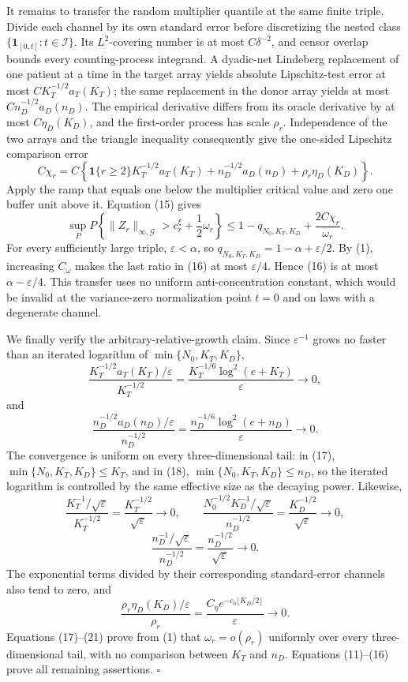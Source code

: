 It remains to transfer the random multiplier quantile at the same finite triple. Divide each channel by its own standard error before discretizing the nested class \(\{\mathbf 1_{[0,t]}:t\in\mathcal I\}\). Its \(L^2\)-covering number is at most \(C\delta^{-2}\), and censor overlap bounds every counting-process integrand. A dyadic-net Lindeberg replacement of one patient at a time in the target array yields absolute Lipschitz-test error at most \(CK_T^{-1/2}a_T(K_T)\); the same replacement in the donor array yields at most \(Cn_D^{-1/2}a_D(n_D)\). The empirical derivative differs from its oracle derivative by at most \(C\eta_D(K_D)\), and the first-order process has scale \(\rho_r\). Independence of the two arrays and the triangle inequality consequently give the one-sided Lipschitz comparison error
\[
 C\chi_r
 =C\left\{\mathbf 1\{r\ge2\}K_T^{-1/2}a_T(K_T)
 +n_D^{-1/2}a_D(n_D)+\rho_r\eta_D(K_D)\right\}. \tag{15}
\]
Apply the ramp that equals one below the multiplier critical value and zero one buffer unit above it. Equation (15) gives
\[
 \sup_P P\!\left\{\|Z_r\|_{\infty,\mathcal G}>c_r^\xi+\frac12\omega_r\right\}
 \le1-q_{N_0,K_T,K_D}+\frac{2C\chi_r}{\omega_r}. \tag{16}
\]
For every sufficiently large triple, \(\varepsilon<\alpha\), so \(q_{N_0,K_T,K_D}=1-\alpha+\varepsilon/2\). By (1), increasing \(C_\omega\) makes the last ratio in (16) at most \(\varepsilon/4\). Hence (16) is at most \(\alpha-\varepsilon/4\). This transfer uses no uniform anti-concentration constant, which would be invalid at the variance-zero normalization point \(t=0\) and on laws with a degenerate channel.

We finally verify the arbitrary-relative-growth claim. Since \(\varepsilon^{-1}\) grows no faster than an iterated logarithm of \(\min\{N_0,K_T,K_D\}\),
\[
 \frac{K_T^{-1/2}a_T(K_T)/\varepsilon}{K_T^{-1/2}}
 =\frac{K_T^{-1/6}\log^2(e+K_T)}{\varepsilon}\longrightarrow0, \tag{17}
\]
and
\[
 \frac{n_D^{-1/2}a_D(n_D)/\varepsilon}{n_D^{-1/2}}
 =\frac{n_D^{-1/6}\log^2(e+n_D)}{\varepsilon}\longrightarrow0. \tag{18}
\]
The convergence is uniform on every three-dimensional tail: in (17), \(\min\{N_0,K_T,K_D\}\le K_T\), and in (18), \(\min\{N_0,K_T,K_D\}\le n_D\), so the iterated logarithm is controlled by the same effective size as the decaying power. Likewise,
\[
 \frac{K_T^{-1}/\sqrt\varepsilon}{K_T^{-1/2}}
 =\frac{K_T^{-1/2}}{\sqrt\varepsilon}\to0,
 \qquad
 \frac{N_0^{-1/2}K_D^{-1}/\sqrt\varepsilon}{n_D^{-1/2}}
 =\frac{K_D^{-1/2}}{\sqrt\varepsilon}\to0, \tag{19}
\]
\[
 \frac{n_D^{-1}/\sqrt\varepsilon}{n_D^{-1/2}}
 =\frac{n_D^{-1/2}}{\sqrt\varepsilon}\to0. \tag{20}
\]
The exponential terms divided by their corresponding standard-error channels also tend to zero, and
\[
 \frac{\rho_r\eta_D(K_D)/\varepsilon}{\rho_r}
 =\frac{C_\eta e^{-c_0\lfloor K_D/2\rfloor}}{\varepsilon}\to0. \tag{21}
\]
Equations (17)--(21) prove from (1) that \(\omega_r=o(\rho_r)\) uniformly over every three-dimensional tail, with no comparison between \(K_T\) and \(n_D\). Equations (11)--(16) prove all remaining assertions. \(\square\)